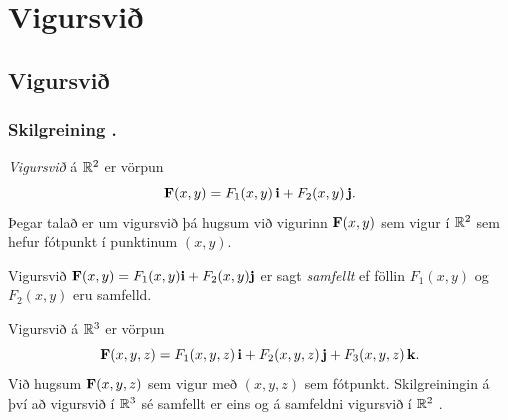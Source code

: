 
\theoremstyle{definition}
\newtheorem{exercise}[theorem]{}





\newbox\mytempbox
\newdimen\mytempdimen

\newcommand\includegraphicscopyright[3][]{%
  \leavevmode\vbox{\vskip3pt\raggedright\setbox\mytempbox=\hbox{\texttt{[image: \#2]}}%
    \mytempdimen=\wd\mytempbox\box\mytempbox\par\vskip1pt%
    \fontsize{3}{3.5}\selectfont{\color{black!25}{\vbox{\hsize=\mytempdimen#3}}}\vskip3pt%
}}

\newenvironment{colortabular}[1]{\medskip\rowcolors[]{1}{blue!20}{blue!10}\tabular{#1}\rowcolor{blue!40}}{\endtabular\medskip}

\def\equad{\leavevmode\hbox{}\quad}

\newenvironment{greencolortabular}[1]
{\medskip\rowcolors[]{1}{green!50!black!20}{green!50!black!10}%
  \tabular{#1}\rowcolor{green!50!black!40}}%
{\endtabular\medskip}




\section{Vigursvið}

\subsection{Vigursvið} 

\subsubsection{Skilgreining \kaflanr.}
 {\em Vigursvið} á ${\mathbb R}^2$ er vörpun
$$\mbox{${\bf F}$}(x,y)=F_1(x,y)\,\mbox{${\bf i}$}+F_2(x,y)\,\mbox{${\bf j}$}.$$
Þegar talað er um vigursvið þá hugsum við vigurinn $\mbox{${\bf F}$}(x,y)$ sem vigur í
${\mathbb R}^2$ sem hefur fótpunkt í punktinum $(x,y)$.   

 \medskip
Vigursvið $\mbox{${\bf F}$}(x,y)=F_1(x,y)\mbox{${\bf i}$}+F_2(x,y)\mbox{${\bf j}$}$ er sagt {\em samfellt} ef
föllin $F_1(x,y)$ og $F_2(x,y)$ eru samfelld.

\medskip
Vigursvið á ${\mathbb R}^3$ er vörpun 
$$\mbox{${\bf F}$}(x,y,z)=F_1(x,y,z)\,\mbox{${\bf i}$}+F_2(x,y,z)\,\mbox{${\bf j}$}+F_3(x,y,z)\,\mbox{${\bf k}$}.$$
Við hugsum $\mbox{${\bf F}$}(x,y,z)$ sem vigur með $(x,y,z)$ sem fótpunkt.
  Skilgreiningin á því að
vigursvið í ${\mathbb R}^3$ sé samfellt er eins og á samfeldni vigursvið í
${\mathbb R}^2$ . 



